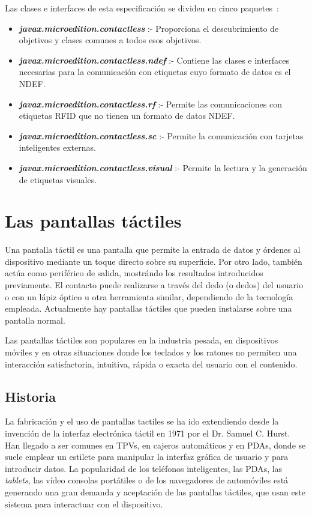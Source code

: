 \begin{itemize}
Las clases e interfaces de esta especificación se dividen en cinco
paquetes~\cite{bib:jsr257}:
\begin{itemize}
\item \emph{\textbf{javax.microedition.contactless}} :- Proporciona el 
descubrimiento de objetivos y clases comunes a todos esos objetivos.
\item \emph{\textbf{javax.microedition.contactless.ndef}} :- Contiene las 
clases e interfaces necesarias para la comunicación con etiquetas cuyo formato 
de datos es el \acs{NDEF}.
\item \emph{\textbf{javax.microedition.contactless.rf}} :- Permite las 
comunicaciones con etiquetas \acs{RFID} que no tienen un formato de datos
\acs{NDEF}.
\item \emph{\textbf{javax.microedition.contactless.sc}} :- Permite la 
comunicación con tarjetas inteligentes externas.
\item \emph{\textbf{javax.microedition.contactless.visual}} :- Permite la 
lectura y la generación de etiquetas visuales.
\end{itemize}
\end{itemize}

\section{Las pantallas táctiles}

Una pantalla táctil es una pantalla que permite la entrada de datos y órdenes 
al dispositivo mediante un toque directo sobre su superficie. Por otro lado, 
también actúa como periférico de salida, mostrándo los resultados introducidos 
previamente. El contacto puede realizarse a través del dedo (o dedos) del
usuario o con un lápiz óptico u otra herramienta similar, dependiendo de la 
tecnología empleada. Actualmente hay pantallas táctiles que pueden instalarse 
sobre una pantalla normal.

Las pantallas táctiles son populares en la industria pesada, en dispositivos
móviles y en otras situaciones donde los teclados y los ratones no permiten una 
interacción satisfactoria, intuitiva, rápida o exacta del usuario con el 
contenido.

  \subsection{Historia}
La fabricación y el uso de pantallas tactiles se ha ido extendiendo desde la 
invención de la interfaz electrónica táctil en 1971 por el Dr. Samuel C. Hurst. 
Han llegado a ser comunes en \acs{TPV}s, en cajeros automáticos y en
\acs{PDA}s, donde se suele emplear un estilete para manipular la interfaz 
gráfica de usuario y para introducir datos. La popularidad de los teléfonos 
inteligentes, las \acs{PDA}s, las \emph{tablets}, las vídeo consolas portátiles 
o de los navegadores de automóviles está generando una gran demanda y 
aceptación de las pantallas táctiles, que usan este sistema para interactuar
con el dispositivo.

